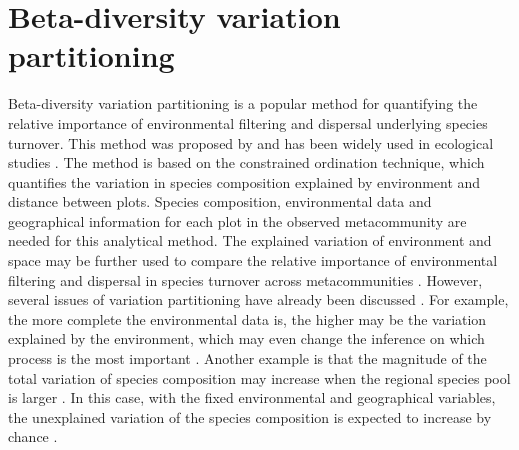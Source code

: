 \section{Beta-diversity variation partitioning}
\noindent
\label{sec:VP}
Beta-diversity variation partitioning is a popular method for quantifying the relative importance of environmental filtering and dispersal underlying species turnover. This method was proposed by \citet{borcard1992partialling} and has been widely used in ecological studies \citep{cottenie2005integrating, peres2006variation, smith2010variation}. The method is based on the constrained ordination technique, which quantifies the variation in species composition explained by environment and distance between plots. Species composition, environmental data and geographical information for each plot in the observed metacommunity are needed for this analytical method. The explained variation of environment and space may be further used to compare the relative importance of environmental filtering and dispersal in species turnover across metacommunities \citep{cottenie2005integrating}. However, several issues of variation partitioning have already been discussed \citep[chap.~4]{leibold2017metacommunity}. For example, the more complete the environmental data is, the higher may be the variation explained by the environment, which may even change the inference on which process is the most important \citep{chang2013better}. Another example is that the magnitude of the total variation of species composition may increase when the regional species pool is larger \citep{kraft2011disentangling}. In this case, with the fixed environmental and geographical variables, the unexplained variation of the species composition is expected to increase by chance \citep[pp.~124]{leibold2017metacommunity}.

